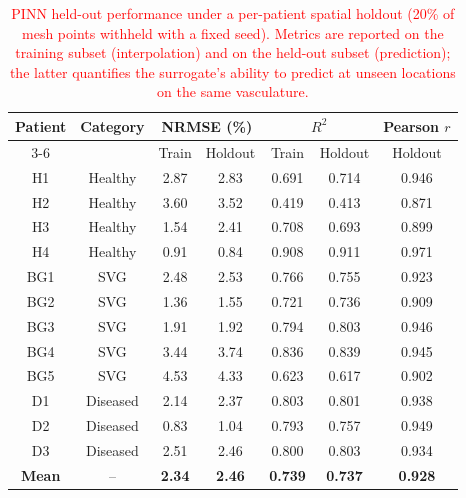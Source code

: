 ﻿\documentclass[12pt,a4paper]{article}
\theoremstyle{definition}
\numberwithin{equation}{section}
\begin{document}
\begin{table}[!htbp]
\color{red}%
\centering
\setlength{\tabcolsep}{4pt}
\renewcommand{\arraystretch}{0.95}
\caption{\textcolor{red}{PINN held-out performance under a per-patient spatial holdout (20\% of mesh points withheld with a fixed seed). Metrics are reported on the training subset (interpolation) and on the held-out subset (prediction); the latter quantifies the surrogate's ability to predict at unseen locations on the same vasculature.}}
\label{tab:pinn_holdout}
\begin{tabular}{|c|c|c|c|c|c|c|}
\hline
\multirow{2}{*}{\textbf{Patient}} & \multirow{2}{*}{\textbf{Category}} & \multicolumn{2}{c|}{\textbf{NRMSE (\%)}} & \multicolumn{2}{c|}{\textbf{$R^2$}} & \textbf{Pearson $r$} \\
\cline{3-6}
 & & Train & Holdout & Train & Holdout & Holdout \\
\hline
H1 & Healthy & 2.87 & 2.83 & 0.691 & 0.714 & 0.946 \\
H2 & Healthy & 3.60 & 3.52 & 0.419 & 0.413 & 0.871 \\
H3 & Healthy & 1.54 & 2.41 & 0.708 & 0.693 & 0.899 \\
H4 & Healthy & 0.91 & 0.84 & 0.908 & 0.911 & 0.971 \\
BG1 & SVG & 2.48 & 2.53 & 0.766 & 0.755 & 0.923 \\
BG2 & SVG & 1.36 & 1.55 & 0.721 & 0.736 & 0.909 \\
BG3 & SVG & 1.91 & 1.92 & 0.794 & 0.803 & 0.946 \\
BG4 & SVG & 3.44 & 3.74 & 0.836 & 0.839 & 0.945 \\
BG5 & SVG & 4.53 & 4.33 & 0.623 & 0.617 & 0.902 \\
D1 & Diseased & 2.14 & 2.37 & 0.803 & 0.801 & 0.938 \\
D2 & Diseased & 0.83 & 1.04 & 0.793 & 0.757 & 0.949 \\
D3 & Diseased & 2.51 & 2.46 & 0.800 & 0.803 & 0.934 \\
\hline
\textbf{Mean} & -- & \textbf{2.34} & \textbf{2.46} & \textbf{0.739} & \textbf{0.737} & \textbf{0.928} \\
\hline
\end{tabular}
\end{table}
\end{document}
